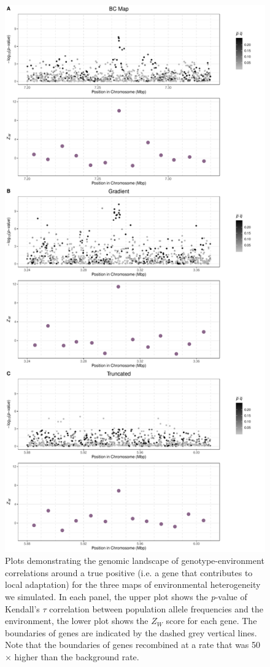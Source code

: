\documentclass[10pt,twoside,lineno, twocolumn]{GSA_format}
\begin{document}
\begin{figure}[H]
  \includegraphics[height=0.9\textheight,keepaspectratio]{Plots/all_maps_plot_demo.pdf}
  \caption{Plots demonstrating the genomic landscape of genotype-environment correlations around a true positive (i.e. a gene that contributes to local adaptation) for the three maps of environmental heterogeneity we simulated. In each panel, the upper plot shows the \textit{p}-value of Kendall's $\tau$ correlation between population allele frequencies and the environment, the lower plot shows the $Z_W$ score for each gene. The boundaries of genes are indicated by the dashed grey vertical lines. Note that the boundaries of genes recombined at a rate that was 50$\times$ higher than the background rate. }

  \label{fig:demoPlots}
\end{figure}
\end{document}
